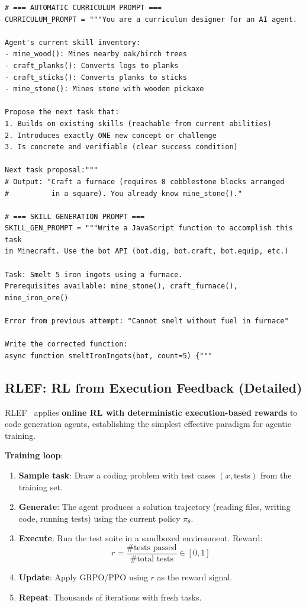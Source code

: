 \begin{examplebox}
\begin{lstlisting}[style=pythonstyle]
# === AUTOMATIC CURRICULUM PROMPT ===
CURRICULUM_PROMPT = """You are a curriculum designer for an AI agent.

Agent's current skill inventory:
- mine_wood(): Mines nearby oak/birch trees
- craft_planks(): Converts logs to planks
- craft_sticks(): Converts planks to sticks
- mine_stone(): Mines stone with wooden pickaxe

Propose the next task that:
1. Builds on existing skills (reachable from current abilities)
2. Introduces exactly ONE new concept or challenge
3. Is concrete and verifiable (clear success condition)

Next task proposal:"""
# Output: "Craft a furnace (requires 8 cobblestone blocks arranged
#          in a square). You already know mine_stone()."

# === SKILL GENERATION PROMPT ===
SKILL_GEN_PROMPT = """Write a JavaScript function to accomplish this task
in Minecraft. Use the bot API (bot.dig, bot.craft, bot.equip, etc.)

Task: Smelt 5 iron ingots using a furnace.
Prerequisites available: mine_stone(), craft_furnace(), mine_iron_ore()

Error from previous attempt: "Cannot smelt without fuel in furnace"

Write the corrected function:
async function smeltIronIngots(bot, count=5) {"""
\end{lstlisting}
\end{examplebox}

\subsection{RLEF: RL from Execution Feedback (Detailed)}
\label{rlef-rl-from-execution-feedback-detailed}

RLEF~\cite{le2024rlef} applies \textbf{online RL with deterministic execution-based rewards} to code generation agents, establishing the simplest effective paradigm for agentic training.

\textbf{Training loop}:

\begin{enumerate}
  \item \textbf{Sample task}: Draw a coding problem with test cases $(x, \text{tests})$ from the training set.
  \item \textbf{Generate}: The agent produces a solution trajectory (reading files, writing code, running tests) using the current policy $\pi_\theta$.
  \item \textbf{Execute}: Run the test suite in a sandboxed environment. Reward: 
\begin{equation}
r = \frac{\text{\# tests passed}}{\text{\# total tests}} \in [0, 1]
\end{equation}
  \item \textbf{Update}: Apply GRPO/PPO using $r$ as the reward signal.
  \item \textbf{Repeat}: Thousands of iterations with fresh tasks.
\end{enumerate}

